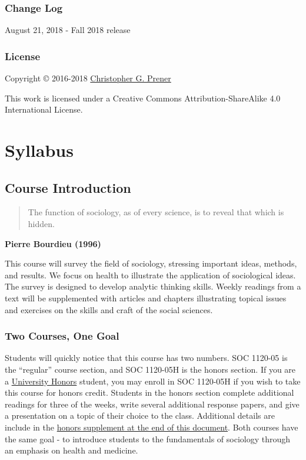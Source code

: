 \documentclass[]{book}
\theoremstyle{definition}
\theoremstyle{definition}
\theoremstyle{definition}
\theoremstyle{remark}
\begin{document}
\hypertarget{change-log}{%
\section*{Change Log}\label{change-log}}

August 21, 2018 - Fall 2018 release

\hypertarget{license}{%
\section*{License}\label{license}}

Copyright © 2016-2018 \href{https://chris-prener.github.io}{Christopher
G. Prener}

This work is licensed under a Creative Commons Attribution-ShareAlike
4.0 International License.

\hypertarget{part-syllabus}{%
\part{Syllabus}\label{part-syllabus}}

\hypertarget{course-introduction}{%
\chapter{Course Introduction}\label{course-introduction}}

\begin{quote}
The function of sociology, as of every science, is to reveal that which
is hidden.
\end{quote}

\textbf{Pierre Bourdieu (1996)}

This course will survey the field of sociology, stressing important
ideas, methods, and results. We focus on health to illustrate the
application of sociological ideas. The survey is designed to develop
analytic thinking skills. Weekly readings from a text will be
supplemented with articles and chapters illustrating topical issues and
exercises on the skills and craft of the social sciences.

\hypertarget{two-courses-one-goal}{%
\section{Two Courses, One Goal}\label{two-courses-one-goal}}

Students will quickly notice that this course has two numbers. SOC
1120-05 is the ``regular'' course section, and SOC 1120-05H is the
honors section. If you are a
\href{https://www.slu.edu/honors/index.php}{University Honors} student,
you may enroll in SOC 1120-05H if you wish to take this course for
honors credit. Students in the honors section complete additional
readings for three of the weeks, write several additional response
papers, and give a presentation on a topic of their choice to the class.
Additional details are include in the
\href{/honors-overview.html}{honors supplement at the end of this
document}. Both courses have the same goal - to introduce students to
the fundamentals of sociology through an emphasis on health and
medicine.
\end{document}
